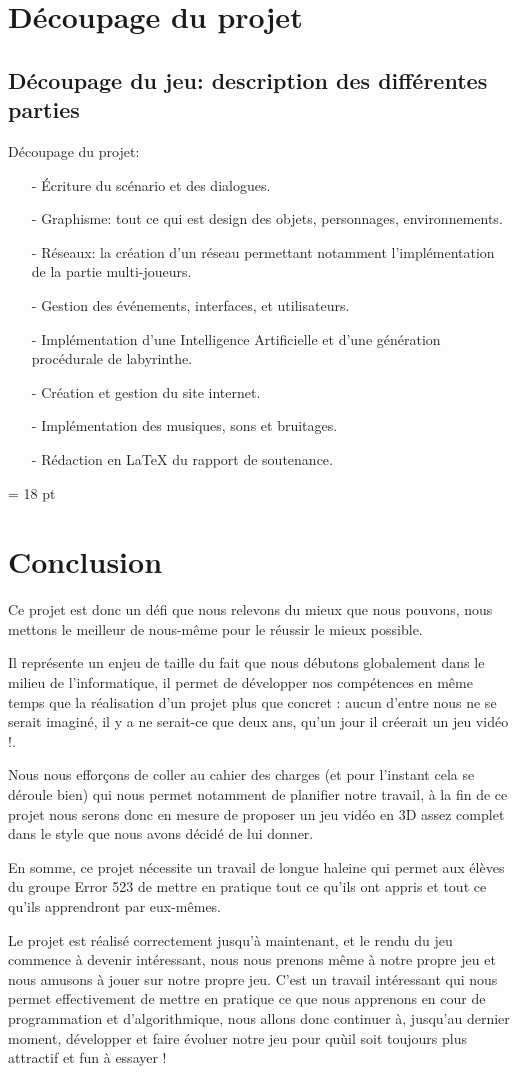 \documentclass[12pt,a4paper]{article}
\begin{document}
\newpage
\section{Découpage du projet}
\subsection{Découpage du jeu: description des différentes \newline parties}
Découpage du projet:
\begin{itemize}
\item[-] Écriture du scénario et des dialogues.
\item[-] Graphisme: tout ce qui est design des objets, personnages, environnements.
\item[-] Réseaux: la création d'un réseau permettant notamment l'implémentation de la partie multi-joueurs.
\item[-] Gestion des événements, interfaces, et utilisateurs.
\item[-] Implémentation d'une Intelligence Artificielle et d'une génération procédurale de labyrinthe.
\item[-] Création et gestion du site internet.
\item[-] Implémentation des musiques, sons et bruitages.
\item[-] Rédaction en LaTeX du rapport de soutenance.
\end{itemize}

\newpage
\baselineskip = 18 pt
\section{Conclusion}
Ce projet est donc un défi que nous relevons du mieux que nous pouvons, nous mettons le meilleur de nous-même pour le réussir le mieux possible.

Il représente un enjeu de taille du fait que nous débutons globalement dans le milieu de l'informatique, il permet de développer nos compétences en même temps que la réalisation d'un projet plus que concret : aucun d'entre nous ne se serait imaginé, il y a ne serait-ce que deux ans, qu'un jour il créerait un jeu vidéo !.

Nous nous efforçons de coller au cahier des charges (et pour l'instant cela se déroule bien) qui nous permet notamment de planifier notre travail, à la fin de ce projet nous serons donc en mesure de proposer un jeu vidéo en 3D assez complet dans le style que nous avons décidé de lui donner.

En somme, ce projet nécessite un travail de longue haleine qui permet aux élèves du groupe Error 523 de mettre en pratique tout ce qu'ils ont appris et tout ce qu'ils apprendront par eux-mêmes.

Le projet est réalisé correctement jusqu'à maintenant, et le rendu du jeu commence à devenir intéressant, nous nous prenons même à notre propre jeu et nous amusons à jouer sur notre propre jeu.
C'est un travail intéressant qui nous permet effectivement de mettre en pratique ce que nous apprenons en cour de programmation et d'algorithmique, nous allons donc continuer à, jusqu'au dernier moment, développer et faire évoluer notre jeu pour quùil soit toujours plus attractif et fun à essayer ! 
\end{document}
